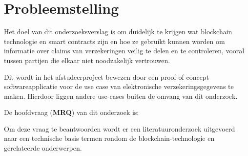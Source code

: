 \section{Probleemstelling}\label{chap:researchQuestions}
Het doel van dit onderzoeksverslag is om duidelijk te krijgen wat blockchain technologie en smart contracts zijn en hoe ze gebruikt kunnen worden om informatie over claims van verzekeringen veilig te delen en te controleren, vooral tussen partijen die elkaar niet noodzakelijk vertrouwen.\par
Dit wordt in het afstudeerproject bewezen door een proof of concept softwareapplicatie voor de use case van elektronische verzekeringsgegevens te maken. Hierdoor liggen andere use-cases buiten de omvang van dit onderzoek.
\par	
De hoofdvraag (\textbf{MRQ}) van dit onderzoek is:
\begin{center}
	\textbf{\researchQuestionMain}
\end{center}
Om deze vraag te beantwoorden wordt er een literatuuronderzoek uitgevoerd naar een technische basis termen rondom de blockchain-technologie en gerelateerde onderwerpen.
\newpage